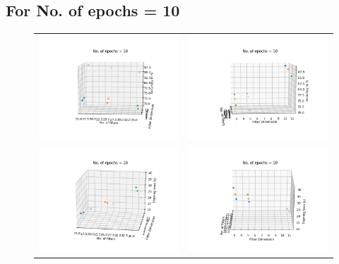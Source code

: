 \documentclass{article} %
\begin{document}
\subsection{For No. of epochs = 10}
\begin{figure}[H]
\centering
\begin{tabular}{cc}
\includegraphics[width=0.5\linewidth]{images/e10a1.png}
&
\includegraphics[width=0.5\linewidth]{images/e10a2.png}
\\
\includegraphics[width=0.5\linewidth]{images/e10t1.png}
&
\includegraphics[width=0.5\linewidth]{images/e10t2.png}
\end{tabular}
\end{figure}
\end{document}
